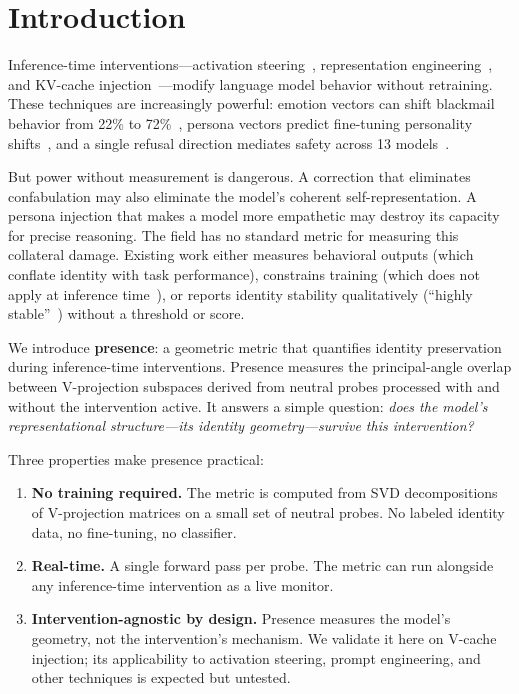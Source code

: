 \documentclass[11pt,a4paper]{article}
\begin{document}
\section{Introduction}
\label{sec:intro}

Inference-time interventions---activation steering~\citep{turner2024steering},
representation engineering~\citep{zou2023representation}, and KV-cache
injection~\citep{pustovit2026knowledge}---modify language model behavior
without retraining. These techniques are increasingly powerful: emotion vectors
can shift blackmail behavior from 22\% to 72\%~\citep{anthropic2026emotion},
persona vectors predict fine-tuning personality shifts~\citep{chen2025persona},
and a single refusal direction mediates safety across 13
models~\citep{arditi2024refusal}.

But power without measurement is dangerous. A correction that eliminates
confabulation may also eliminate the model's coherent self-representation.
A persona injection that makes a model more empathetic may destroy its
capacity for precise reasoning. The field has no standard metric for
measuring this collateral damage. Existing work either measures behavioral
outputs (which conflate identity with task performance), constrains training
(which does not apply at inference time~\citep{zhang2025guardspace}), or
reports identity stability qualitatively (``highly
stable''~\citep{aneja2026intrinsic}) without a threshold or score.

We introduce \textbf{presence}: a geometric metric that quantifies identity
preservation during inference-time interventions. Presence measures the
principal-angle overlap between V-projection subspaces derived from neutral
probes processed with and without the intervention active. It answers a
simple question: \emph{does the model's representational structure---its
identity geometry---survive this intervention?}

Three properties make presence practical:
\begin{enumerate}[nosep]
  \item \textbf{No training required.} The metric is computed from SVD
    decompositions of V-projection matrices on a small set of neutral probes.
    No labeled identity data, no fine-tuning, no classifier.
  \item \textbf{Real-time.} A single forward pass per probe. The metric can
    run alongside any inference-time intervention as a live monitor.
  \item \textbf{Intervention-agnostic by design.} Presence measures the
    model's geometry, not the intervention's mechanism. We validate it here
    on V-cache injection; its applicability to activation steering, prompt
    engineering, and other techniques is expected but untested.
\end{enumerate}
\end{document}
